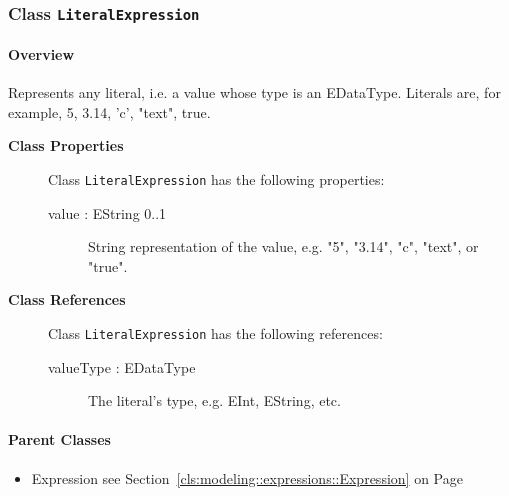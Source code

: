 \subsubsection{\Large{Class \bfseries \texttt{LiteralExpression}\normalfont}}
\label{cls:modeling::expressions::LiteralExpression} 
\paragraph{Overview}

	
			
Represents any literal, i.e. a value whose type is an EDataType. Literals are, for example, 5, 3.14, 'c', "text", true.	
		
	


\begin{description}

	\item[\textbf{Class Properties}] Class \texttt{LiteralExpression} has the following properties:
	\begin{description}
\item[value : EString 			0..1]

\hspace{\fill}
\nopagebreak


	
			
String representation of the value, e.g. "5", "3.14", "c", "text", or "true".	
		
	
	\end{description}
	
	\item[\textbf{Class References}] Class \texttt{LiteralExpression} has the following references:
	\begin{description}
\item[valueType : EDataType 	]

\hspace{\fill}
\nopagebreak


	
			
The literal's type, e.g. EInt, EString, etc.	
			
	
		
	
	\end{description}
	

\end{description}

\paragraph{Parent Classes}
\begin{itemize}
\item Expression see Section~\ref{cls:modeling::expressions::Expression} on Page~\pageref{cls:modeling::expressions::Expression}\end{itemize}
